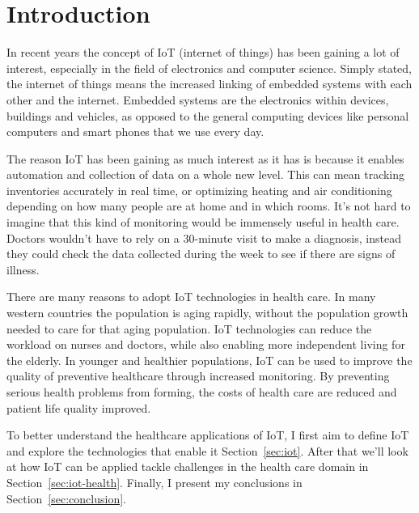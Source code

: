 \section{Introduction}

In recent years the concept of IoT (internet of things) has been gaining a lot
of interest, especially in the field of electronics and computer science.
Simply stated, the internet of things means the increased linking of embedded
systems with each other and the internet. Embedded systems are the electronics
within devices, buildings and vehicles, as opposed to the general computing
devices like personal computers and smart phones that we use every day.

The reason IoT has been gaining as much interest as it has is because it
enables automation and collection of data on a whole new level. This can mean
tracking inventories accurately in real time, or optimizing heating and air
conditioning depending on how many people are at home and in which rooms. It's
not hard to imagine that this kind of monitoring would be immensely useful in
health care. Doctors wouldn't have to rely on a 30-minute visit to make a
diagnosis, instead they could check the data collected during the week to see
if there are signs of illness.

There are many reasons to adopt IoT technologies in health care. In many
western countries the population is aging rapidly, without the population growth
needed to care for that aging population. IoT technologies can reduce the
workload on nurses and doctors, while also enabling more independent living for
the elderly. In younger and healthier populations, IoT can be used to improve
the quality of preventive healthcare through increased monitoring. By
preventing serious health problems from forming, the costs of health care are
reduced and patient life quality improved.~\cite{Bui2011}

To better understand the healthcare applications of IoT, I first aim to define IoT and
explore the technologies that enable it Section~\ref{sec:iot}. After that we'll
look at how IoT can be applied tackle challenges in the health care domain in
Section~\ref{sec:iot-health}. Finally, I present my conclusions in
Section~\ref{sec:conclusion}.
